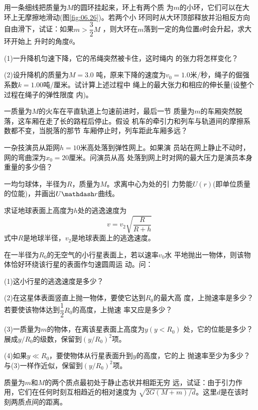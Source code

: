 \begin{exercises}
\exercise 用一条细线把质量为$ M $的圆环挂起来，环上有两个质
为$ m $的小环，它们可以在大环上无摩擦地滑动(图\ref{fig:06.26})。若两个小
环同时从大环顶部释放并沿相反方向自由滑下，试证：如果$ m >
  \dfrac { 3 } { 2 } M $
，则大环在$ m $落到一定的角位置$ \theta $时会升起，求大环开始上
升时的角度$ \theta $。

\exercise (1)一升降机匀速下降，它的吊绳突然被卡住，这时绳内
的张力将怎样变化？

(2)设升降机的质量为$ M = 3.0 $ 吨，原来下降的速度为$ v _ { 0 } =
  1.0 $米/秒，绳子的倔强系数$ k = 1.00 $吨/厘米。试计算上述过程中
绳上的最大张力和相应的伸长量(设整个过程在绳子的弹性限度
内)。

\clearpage
\exercise 一质量为$ M $的火车在平直轨道上匀速前进时，最后一节
质量为$ m $的车厢突然脱落，这车厢在走了长的路程后停止。假设
机车的牵引力和列车与轨道间的摩擦系数都不变，当脱落的那节
车厢停止时，列车距此车厢多远？

\exercise 一杂技演员从距网$ h = 1 0 $米高处落到弹性网上。如果演
员站在网上静止不动时，网的弯曲深为$ x _ { 0 } = 2 0 $厘米。问演员从高
处落到网上时对网的最大压力是演员本身重量的多少倍？

\exercise 一均匀球体，半径为$ R $，质量为$ M $。求离中心为处的引
力势能$ U\left(r\right) $(即单位质量的位能)，并画出$ U \mathdash r $曲线。

\exercise 求证地球表面上高度为$ h $处的逃逸速度为
\begin{equation*}
  v = v _ { 2 } \sqrt { \frac { R } { R + h } }
\end{equation*}
式中$ R $是地球半径，$ v _ { 2 } $是地球表面上的逃逸速度。

\exercise 在一半径为$ R_0 $的无空气的小行星表面上，若以速率$ v_0 $水
平地抛出一物体，则该物体恰好环绕该行星的表面作匀速圆周运
动。问：

(1)这小行星的逃逸速度是多少？

(2)在这星体表面竖直上抛一物体，要使它达到$ R_0 $的最大高
度，上抛速率是多少？若要使该物体达到$
  \dfrac { 1 } { 2 } R_0 $的高度，上抛速
率又应是多少？

(3)一质量为$ m $的物体，在离该星表面上高度为$ y \left( y < R _ { 0 } \right) $
处，它的位能是多少？\lhbrak 展成$ y / R _ { 0 } $的级数，保留到$ \left( y / R _ { 0 } \right) ^ { 2 } $项。\rhbrak

(4)如果$ y \ll R _ { 0 } $，要使物体从行星表面升到$ y $的高度，它的上
抛速率至少为多少？\lhbrak 与(3)一样作近似，保留到$ \left( y / R _ { 0 } \right) ^ { 2 } $项。\rhbrak

\exercise 质量为$ m $和$ M $的两个质点最初处于静止态状并相距无穷
远，试证：由于引力作用，它们在任何时刻互相趋近的相对速度为
$ \sqrt { 2 G \left( M + m \right) / d } $。这里$ d $是在该时刻两质点间的距离。


\end{exercises}
